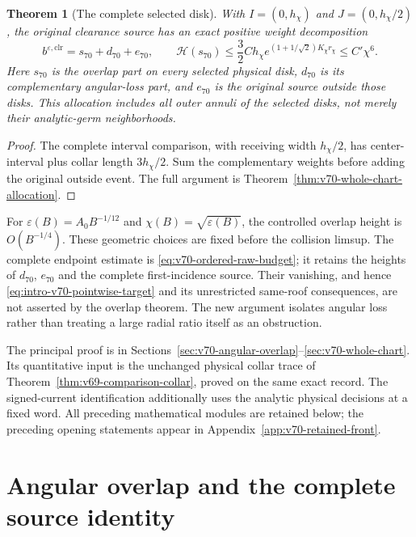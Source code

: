 \documentclass[11pt,reqno]{amsart}
\numberwithin{equation}{section}
\newtheorem{leadtheorem}{Theorem}
\theoremstyle{definition}\newtheorem{definition}[theorem]{Definition}
\theoremstyle{remark}\newtheorem{remark}[theorem]{Remark}
\begin{document}
\begin{leadtheorem}[The complete selected disk]
\label{thm:intro-v70-whole-chart}
With $I=(0,h_\chi)$ and $J=(0,h_\chi/2)$, the original clearance
source has an exact positive weight decomposition
\[
 b^{\varepsilon,\mathrm{clr}}=s_{70}+d_{70}+e_{70},\qquad
 \mathcal H(s_{70})\le\frac32Ch_\chi
                   e^{(1+1/\sqrt2)K_\chi r_\chi}\le C'\chi^6.
\]
Here $s_{70}$ is the overlap part on every selected physical disk,
$d_{70}$ is its complementary angular-loss part, and $e_{70}$ is
the original source outside those disks. This allocation includes all
outer annuli of the selected disks, not merely their analytic-germ
neighborhoods.
\end{leadtheorem}
\begin{proof}
The complete interval comparison, with receiving width $h_\chi/2$,
has center-interval plus collar length $3h_\chi/2$. Sum the
complementary weights before adding the original outside event.
The full argument is Theorem~\ref{thm:v70-whole-chart-allocation}.
\end{proof}

For $\varepsilon(B)=A_0B^{-1/12}$ and
$\chi(B)=\sqrt{\varepsilon(B)}$, the controlled overlap height is
$O(B^{-1/4})$. These geometric choices are fixed before the collision
limsup. The complete endpoint estimate is
\eqref{eq:v70-ordered-raw-budget}; it retains the heights of $d_{70}$,
$e_{70}$ and the complete first-incidence source. Their vanishing,
and hence \eqref{eq:intro-v70-pointwise-target} and its unrestricted
same-roof consequences, are not asserted by the overlap theorem.
The new argument isolates angular loss rather than treating a large
radial ratio itself as an obstruction.

The principal proof is in
Sections~\ref{sec:v70-angular-overlap}--\ref{sec:v70-whole-chart}.
Its quantitative input is the unchanged physical collar trace of
Theorem~\ref{thm:v69-comparison-collar}, proved on the same exact
record. The signed-current identification additionally uses the
analytic physical decisions at a fixed word. All preceding mathematical
modules are retained below; the preceding opening statements appear
in Appendix~\ref{app:v70-retained-front}.

\part{Angular overlap and the complete source identity}



\end{document}
